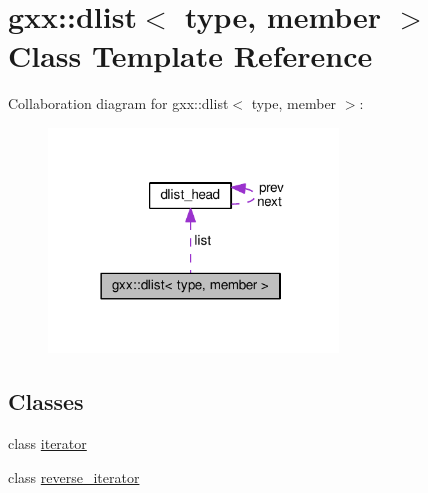 \hypertarget{classgxx_1_1dlist}{}\section{gxx\+:\+:dlist$<$ type, member $>$ Class Template Reference}
\label{classgxx_1_1dlist}


Collaboration diagram for gxx\+:\+:dlist$<$ type, member $>$\+:
\nopagebreak
\begin{figure}[H]
\begin{center}
\leavevmode
\includegraphics[width=218pt]{classgxx_1_1dlist__coll__graph}
\end{center}
\end{figure}
\subsection*{Classes}
\begin{DoxyCompactItemize}
\item 
class \hyperlink{classgxx_1_1dlist_1_1iterator}{iterator}
\item 
class \hyperlink{classgxx_1_1dlist_1_1reverse__iterator}{reverse\+\_\+iterator}
\end{DoxyCompactItemize}
